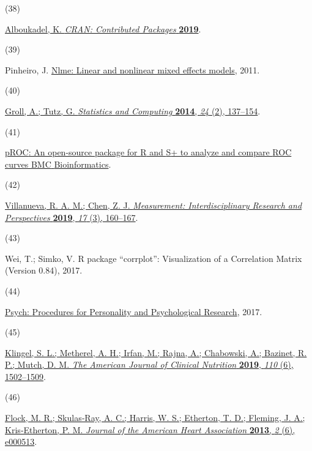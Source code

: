 \documentclass[journal=jacsat,manuscript=article]{achemso}
\newlength{\cslhangindent}
\newlength{\csllabelwidth}
\newenvironment{CSLReferences}[2] %
 {\begin{list}{}{%
  \setlength{\itemindent}{0pt}
  \setlength{\leftmargin}{0pt}
  \setlength{\parsep}{0pt}
  \ifodd #1
   \setlength{\leftmargin}{\cslhangindent}
   \setlength{\itemindent}{-1\cslhangindent}
  \fi
  \setlength{\itemsep}{#2\baselineskip}}}
 {\end{list}}
\newcommand{\CSLLeftMargin}[1]{\parbox[t]{\csllabelwidth}{#1}}
\newcommand{\CSLRightInline}[1]{\parbox[t]{\linewidth - \csllabelwidth}{#1}\break}
\begin{document}
\begin{CSLReferences}{0}{0}
\CSLLeftMargin{(38) }%
\CSLRightInline{\href{https://doi.org/10.32614/cran.package.rstatix}{Alboukadel,
K. \emph{CRAN: Contributed Packages} \textbf{2019}}.}

\CSLLeftMargin{(39) }%
\CSLRightInline{Pinheiro, J.
\href{https://cir.nii.ac.jp/crid/1370861707120203021}{Nlme: {Linear} and
nonlinear mixed effects models}, 2011.}

\CSLLeftMargin{(40) }%
\CSLRightInline{\href{https://doi.org/10.1007/s11222-012-9359-z}{Groll,
A.; Tutz, G. \emph{Statistics and Computing} \textbf{2014}, \emph{24}
(2), 137--154}.}

\CSLLeftMargin{(41) }%
\CSLRightInline{\href{https://link.springer.com/article/10.1186/1471-2105-12-77}{{pROC}:
An open-source package for {R} and {S}+ to analyze and compare {ROC}
curves {\textbar} {BMC} {Bioinformatics}}.}

\CSLLeftMargin{(42) }%
\CSLRightInline{\href{https://doi.org/10.1080/15366367.2019.1565254}{Villanueva,
R. A. M.; Chen, Z. J. \emph{Measurement: Interdisciplinary Research and
Perspectives} \textbf{2019}, \emph{17} (3), 160--167}.}

\CSLLeftMargin{(43) }%
\CSLRightInline{Wei, T.; Simko, V. R package {``corrplot''}:
{Visualization} of a {Correlation} {Matrix} ({Version} 0.84), 2017.}

\CSLLeftMargin{(44) }%
\CSLRightInline{\href{https://CRAN.R-project.org/package=psych}{Psych:
{Procedures} for {Personality} and {Psychological} {Research}}, 2017.}

\CSLLeftMargin{(45) }%
\CSLRightInline{\href{https://doi.org/10.1093/ajcn/nqz234}{Klingel, S.
L.; Metherel, A. H.; Irfan, M.; Rajna, A.; Chabowski, A.; Bazinet, R.
P.; Mutch, D. M. \emph{The American Journal of Clinical Nutrition}
\textbf{2019}, \emph{110} (6), 1502--1509}.}

\CSLLeftMargin{(46) }%
\CSLRightInline{\href{https://doi.org/10.1161/JAHA.113.000513}{Flock, M.
R.; Skulas‐Ray, A. C.; Harris, W. S.; Etherton, T. D.; Fleming, J. A.;
Kris‐Etherton, P. M. \emph{Journal of the American Heart Association}
\textbf{2013}, \emph{2} (6), e000513}.}


\end{CSLReferences}
\end{document}
